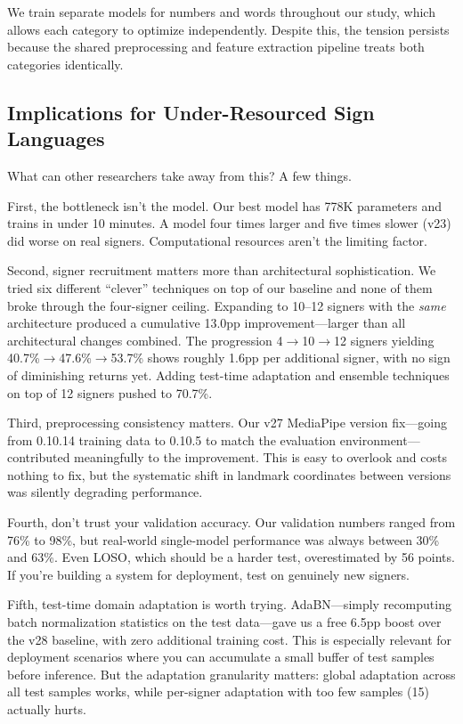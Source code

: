 \documentclass[conference]{IEEEtran}
\begin{document}
We train separate models for numbers and words throughout our study, which allows each category to optimize independently. Despite this, the tension persists because the shared preprocessing and feature extraction pipeline treats both categories identically.

\subsection{Implications for Under-Resourced Sign Languages}

What can other researchers take away from this? A few things.

First, the bottleneck isn't the model. Our best model has 778K parameters and trains in under 10 minutes. A model four times larger and five times slower (v23) did worse on real signers. Computational resources aren't the limiting factor.

Second, signer recruitment matters more than architectural sophistication. We tried six different ``clever'' techniques on top of our baseline and none of them broke through the four-signer ceiling. Expanding to 10--12 signers with the \textit{same} architecture produced a cumulative 13.0pp improvement---larger than all architectural changes combined. The progression 4$\to$10$\to$12 signers yielding 40.7\%$\to$47.6\%$\to$53.7\% shows roughly 1.6pp per additional signer, with no sign of diminishing returns yet. Adding test-time adaptation and ensemble techniques on top of 12 signers pushed to 70.7\%.

Third, preprocessing consistency matters. Our v27 MediaPipe version fix---going from 0.10.14 training data to 0.10.5 to match the evaluation environment---contributed meaningfully to the improvement. This is easy to overlook and costs nothing to fix, but the systematic shift in landmark coordinates between versions was silently degrading performance.

Fourth, don't trust your validation accuracy. Our validation numbers ranged from 76\% to 98\%, but real-world single-model performance was always between 30\% and 63\%. Even LOSO, which should be a harder test, overestimated by 56 points. If you're building a system for deployment, test on genuinely new signers.

Fifth, test-time domain adaptation is worth trying. AdaBN---simply recomputing batch normalization statistics on the test data---gave us a free 6.5pp boost over the v28 baseline, with zero additional training cost. This is especially relevant for deployment scenarios where you can accumulate a small buffer of test samples before inference. But the adaptation granularity matters: global adaptation across all test samples works, while per-signer adaptation with too few samples (15) actually hurts.
\end{document}
